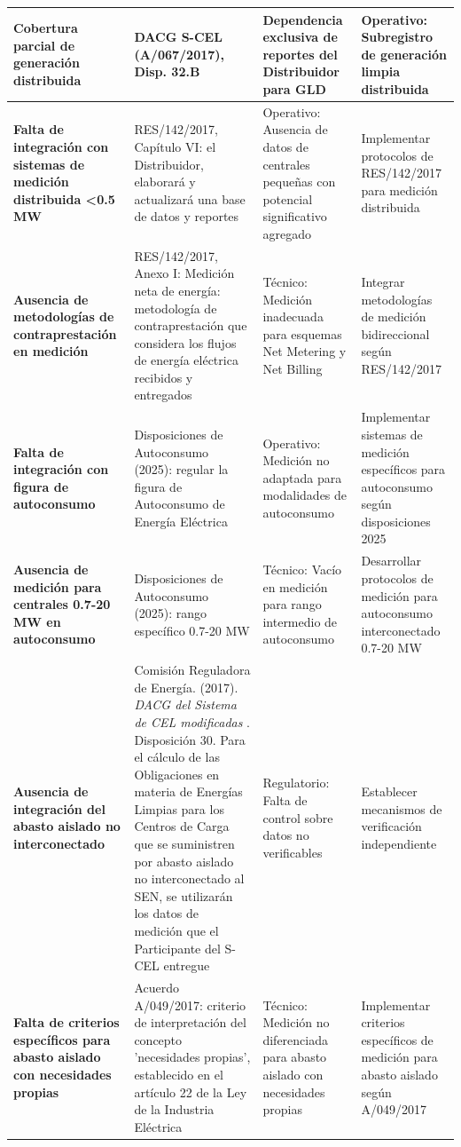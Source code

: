 \documentclass{cel}
\begin{document}
\begin{tabladoradoLargo}
\begin{xltabular}{\textwidth}{|X|X|X|X|}
\textbf{Cobertura parcial de generación distribuida} & DACG S-CEL (A/067/2017), Disp. 32.B & Dependencia exclusiva de reportes del Distribuidor para GLD & Operativo: Subregistro de generación limpia distribuida \\ \hline
\textbf{Falta de integración con sistemas de medición distribuida \textless{}0.5 MW} & RES/142/2017, Capítulo VI: \textquotedbl{}el Distribuidor, elaborará y actualizará una base de datos y reportes\textquotedbl{} & Operativo: Ausencia de datos de centrales pequeñas con potencial significativo agregado & Implementar protocolos de RES/142/2017 para medición distribuida \\ \hline
\textbf{Ausencia de metodologías de contraprestación en medición} & RES/142/2017, Anexo I: \textquotedbl{}Medición neta de energía: metodología de contraprestación que considera los flujos de energía eléctrica recibidos y entregados\textquotedbl{} & Técnico: Medición inadecuada para esquemas Net Metering y Net Billing & Integrar metodologías de medición bidireccional según RES/142/2017 \\ \hline
\textbf{Falta de integración con figura de autoconsumo} & Disposiciones de Autoconsumo (2025): \textquotedbl{}regular la figura de Autoconsumo de Energía Eléctrica\textquotedbl{} & Operativo: Medición no adaptada para modalidades de autoconsumo & Implementar sistemas de medición específicos para autoconsumo según disposiciones 2025 \\ \hline
\textbf{Ausencia de medición para centrales 0.7-20 MW en autoconsumo} & Disposiciones de Autoconsumo (2025): rango específico 0.7-20 MW & Técnico: Vacío en medición para rango intermedio de autoconsumo & Desarrollar protocolos de medición para autoconsumo interconectado 0.7-20 MW \\ \hline
\textbf{Ausencia de integración del abasto aislado no interconectado} & Comisión Reguladora de Energía. (2017). \textit{DACG del Sistema de CEL modificadas} . Disposición 30. \textquotedbl{}Para el cálculo de las Obligaciones en materia de Energías Limpias para los Centros de Carga que se suministren por abasto aislado no interconectado al SEN, se utilizarán los datos de medición que el Participante del S-CEL entregue\textquotedbl{} & Regulatorio: Falta de control sobre datos no verificables & Establecer mecanismos de verificación independiente \\ \hline
\textbf{Falta de criterios específicos para abasto aislado con necesidades propias} & Acuerdo A/049/2017: \textquotedbl{}criterio de interpretación del concepto 'necesidades propias', establecido en el artículo 22 de la Ley de la Industria Eléctrica\textquotedbl{} & Técnico: Medición no diferenciada para abasto aislado con necesidades propias & Implementar criterios específicos de medición para abasto aislado según A/049/2017 \\ \hline

\end{xltabular}
\end{tabladoradoLargo}
\end{document}
